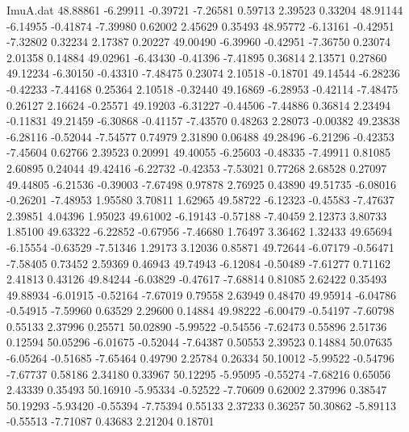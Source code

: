\begin{filecontents}{ImuA.dat}
  48.88861   -6.29911   -0.39721   -7.26581    0.59713    2.39523    0.33204
  48.91144   -6.14955   -0.41874   -7.39980    0.62002    2.45629    0.35493
  48.95772   -6.13161   -0.42951   -7.32802    0.32234    2.17387    0.20227
  49.00490   -6.39960   -0.42951   -7.36750    0.23074    2.01358    0.14884
  49.02961   -6.43430   -0.41396   -7.41895    0.36814    2.13571    0.27860
  49.12234   -6.30150   -0.43310   -7.48475    0.23074    2.10518   -0.18701
  49.14544   -6.28236   -0.42233   -7.44168    0.25364    2.10518   -0.32440
  49.16869   -6.28953   -0.42114   -7.48475    0.26127    2.16624   -0.25571
  49.19203   -6.31227   -0.44506   -7.44886    0.36814    2.23494   -0.11831
  49.21459   -6.30868   -0.41157   -7.43570    0.48263    2.28073   -0.00382
  49.23838   -6.28116   -0.52044   -7.54577    0.74979    2.31890    0.06488
  49.28496   -6.21296   -0.42353   -7.45604    0.62766    2.39523    0.20991
  49.40055   -6.25603   -0.48335   -7.49911    0.81085    2.60895    0.24044
  49.42416   -6.22732   -0.42353   -7.53021    0.77268    2.68528    0.27097
  49.44805   -6.21536   -0.39003   -7.67498    0.97878    2.76925    0.43890
  49.51735   -6.08016   -0.26201   -7.48953    1.95580    3.70811    1.62965
  49.58722   -6.12323   -0.45583   -7.47637    2.39851    4.04396    1.95023
  49.61002   -6.19143   -0.57188   -7.40459    2.12373    3.80733    1.85100
  49.63322   -6.22852   -0.67956   -7.46680    1.76497    3.36462    1.32433
  49.65694   -6.15554   -0.63529   -7.51346    1.29173    3.12036    0.85871
  49.72644   -6.07179   -0.56471   -7.58405    0.73452    2.59369    0.46943
  49.74943   -6.12084   -0.50489   -7.61277    0.71162    2.41813    0.43126
  49.84244   -6.03829   -0.47617   -7.68814    0.81085    2.62422    0.35493
  49.88934   -6.01915   -0.52164   -7.67019    0.79558    2.63949    0.48470
  49.95914   -6.04786   -0.54915   -7.59960    0.63529    2.29600    0.14884
  49.98222   -6.00479   -0.54197   -7.60798    0.55133    2.37996    0.25571
  50.02890   -5.99522   -0.54556   -7.62473    0.55896    2.51736    0.12594
  50.05296   -6.01675   -0.52044   -7.64387    0.50553    2.39523    0.14884
  50.07635   -6.05264   -0.51685   -7.65464    0.49790    2.25784    0.26334
  50.10012   -5.99522   -0.54796   -7.67737    0.58186    2.34180    0.33967
  50.12295   -5.95095   -0.55274   -7.68216    0.65056    2.43339    0.35493
  50.16910   -5.95334   -0.52522   -7.70609    0.62002    2.37996    0.38547
  50.19293   -5.93420   -0.55394   -7.75394    0.55133    2.37233    0.36257
  50.30862   -5.89113   -0.55513   -7.71087    0.43683    2.21204    0.18701

\end{filecontents}
